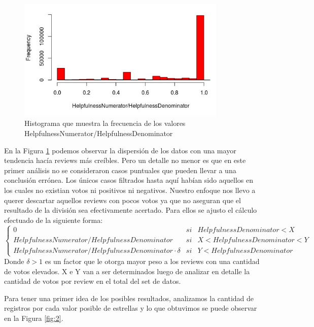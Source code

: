 \documentclass[a4paper,11pt]{report}
\begin{document}
\begin{figure}[htp]
  \begin{center}
    \includegraphics[width=10cm]{helpfullnesnumden}
    \caption{Histograma que muestra la frecuencia de los valores HelpfulnessNumerator/HelpfulnessDenominator}
    \label{fig:1}
  \end{center}
\end{figure}

En la Figura \ref{fig:1} podemos observar la dispersión de los datos con una mayor tendencia hacía reviews más creíbles. Pero un detalle no menor es que en este primer análisis no se consideraron casos puntuales que pueden llevar a una conclusión errónea.
Los únicos casos filtrados hasta aquí habían sido aquellos en los cuales no existian votos ni positivos ni negativos. Nuestro enfoque nos llevo a querer descartar aquellos reviews con pocos votos ya que no aseguran que el resultado de la división sea efectivamente acertado. Para ellos se ajusto el cálculo efectuado de la siguiente forma:
\[ 
   \left \{
      \begin{array}{lcccl}
         0 & si & HelpfulnessDenominator < X\\ 
         Helpfulness Numerator/Helpfulness Denominator  & si & X < HelpfulnessDenominator < Y\\ 
         Helpfulness Numerator/Helpfulness Denominator  \cdot \delta & si & Y < HelpfulnessDenominator
      \end{array}
   \right .
 \]
Donde $\delta > 1$ es un factor que le otorga mayor peso a los reviews con una cantidad de votos elevados. X e Y van a ser determinados luego de analizar en detalle la cantidad de votos por review en el total del set de datos.

Para tener una primer idea de los posibles resultados, analizamos la cantidad de registros por cada valor posible de estrellas y lo que obtuvimos se puede observar en la Figura \ref{fig:2}. 
\end{document}
